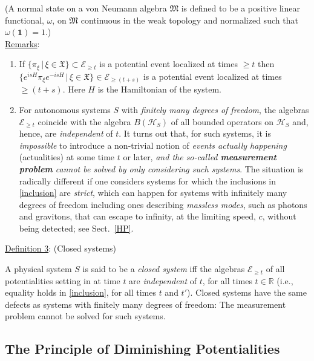 \documentclass[a4paper,11pt]{article}
\begin{document}
\noindent
(A normal state on a von Neumann algebra $\mathfrak{M}$ is defined to be a positive linear 
functional, $\omega$, on $\mathfrak{M}$ continuous in the weak topology and normalized such that $\omega(\mathbf{1})=1$.)\\

\underline{Remarks}: 
\begin{enumerate}
\item{If $\big\{ \pi_{\xi}\, \vert \,\xi \in \mathfrak{X} \big\} \subset \mathcal{E}_{\geq t}$ is a potential event localized at times 
$\geq t$ then $\big\{ e^{isH}\pi_{\xi} e^{-isH} \,\vert\, \xi \in \mathfrak{X} \big\} \in \mathcal{E}_{\geq (t+s)} $ is a 
potential event localized at times $\geq (t+s)$. Here $H$ is the Hamiltonian of the system.} 
\item{For autonomous systems $S$ with \textit{finitely many degrees of freedom}, the algebras $\mathcal{E}_{\geq t}$ coincide with 
the algebra $B(\mathcal{H}_S)$ of all bounded operators on $\mathcal{H}_S$ and, hence, are \textit{independent} of $t$. It 
turns out that, for such systems, it is \textit{impossible} to introduce a non-trivial notion of \textit{events actually happening} 
(actualities) at some time $t$ or later, \textit{and the so-called {\bf{measurement problem}} cannot be solved by only considering such systems}. 
The situation is radically different if one considers systems for which the inclusions in \eqref{inclusion} are \textit{strict}, which 
can happen for systems with infinitely many degrees of freedom including ones describing \textit{massless modes}, such as photons and gravitons, 
that can escape to infinity, at the limiting speed, $c$, without being detected; see Sect.~\ref{HP}.}
\end{enumerate}

 \underline{Definition 3}: (Closed systems)
 
 A physical system $S$ is said to be a \textit{closed system} iff the algebras $\mathcal{E}_{\geq t}$ of all potentialities 
 setting in at time $t$ are \textit{independent} of $t$, for all times $t\in \mathbb{R}$ 
 (i.e., equality holds in \eqref{inclusion}, for all times $t$ and $t'$). Closed systems 
 have the same defects as systems with finitely many degrees of freedom: The 
 measurement problem cannot be solved for such systems.
 
 \subsection{The Principle of Diminishing Potentialities}
\end{document}
